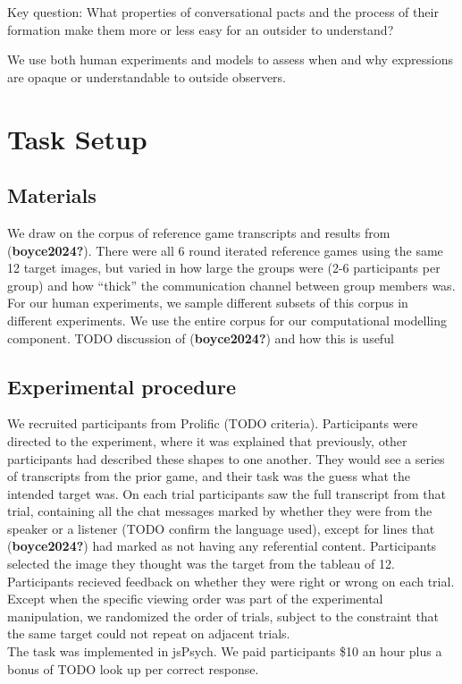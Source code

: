 \documentclass[10pt, letterpaper]{article}
\begin{document}
Key question: What properties of conversational pacts and the process of
their formation make them more or less easy for an outsider to
understand?

We use both human experiments and models to assess when and why
expressions are opaque or understandable to outside observers.

\section{Task Setup}\label{task-setup}

\subsection{Materials}\label{materials}

We draw on the corpus of reference game transcripts and results from
(\textbf{boyce2024?}). There were all 6 round iterated reference games
using the same 12 target images, but varied in how large the groups were
(2-6 participants per group) and how ``thick'' the communication channel
between group members was. For our human experiments, we sample
different subsets of this corpus in different experiments. We use the
entire corpus for our computational modelling component. TODO discussion
of (\textbf{boyce2024?}) and how this is useful

\subsection{Experimental procedure}\label{experimental-procedure}

We recruited participants from Prolific (TODO criteria). Participants
were directed to the experiment, where it was explained that previously,
other participants had described these shapes to one another. They would
see a series of transcripts from the prior game, and their task was the
guess what the intended target was. On each trial participants saw the
full transcript from that trial, containing all the chat messages marked
by whether they were from the speaker or a listener (TODO confirm the
language used), except for lines that (\textbf{boyce2024?}) had marked
as not having any referential content. Participants selected the image
they thought was the target from the tableau of 12. Participants
recieved feedback on whether they were right or wrong on each trial.
Except when the specific viewing order was part of the experimental
manipulation, we randomized the order of trials, subject to the
constraint that the same target could not repeat on adjacent trials.\\
The task was implemented in jsPsych. We paid participants \$10 an hour
plus a bonus of TODO look up per correct response.
\end{document}
